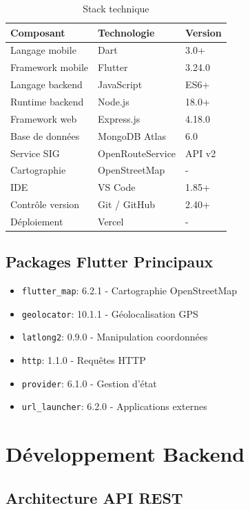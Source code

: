 \documentclass[12pt,a4paper]{report}
\begin{document}
\begin{table}[H]
\centering
\begin{tabular}{|l|l|l|}
\hline
\textbf{Composant} & \textbf{Technologie} & \textbf{Version} \\
\hline
Langage mobile & Dart & 3.0+ \\
Framework mobile & Flutter & 3.24.0 \\
Langage backend & JavaScript & ES6+ \\
Runtime backend & Node.js & 18.0+ \\
Framework web & Express.js & 4.18.0 \\
Base de données & MongoDB Atlas & 6.0 \\
Service SIG & OpenRouteService & API v2 \\
Cartographie & OpenStreetMap & - \\
IDE & VS Code & 1.85+ \\
Contrôle version & Git / GitHub & 2.40+ \\
Déploiement & Vercel & - \\
\hline
\end{tabular}
\caption{Stack technique}
\end{table}

\subsection{Packages Flutter Principaux}

\begin{itemize}
    \item \texttt{flutter\_map}: 6.2.1 - Cartographie OpenStreetMap
    \item \texttt{geolocator}: 10.1.1 - Géolocalisation GPS
    \item \texttt{latlong2}: 0.9.0 - Manipulation coordonnées
    \item \texttt{http}: 1.1.0 - Requêtes HTTP
    \item \texttt{provider}: 6.1.0 - Gestion d'état
    \item \texttt{url\_launcher}: 6.2.0 - Applications externes
\end{itemize}

\section{Développement Backend}

\subsection{Architecture API REST}
\end{document}
